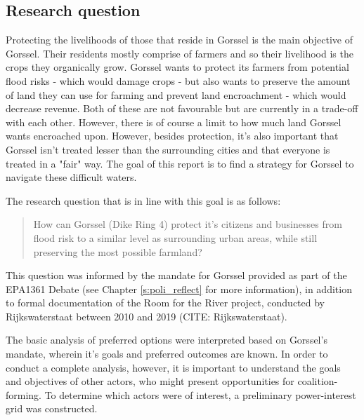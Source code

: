 \subsection{Research question}

Protecting the livelihoods of those that reside in Gorssel is the main objective of Gorssel. Their residents mostly comprise of farmers and so their livelihood is the crops they organically grow. Gorssel wants to protect its farmers from potential flood risks - which would damage crops - but also wants to preserve the amount of land they can use for farming and prevent land encroachment - which would decrease revenue. Both of these are not favourable but are currently in a trade-off with each other. However, there is of course a limit to how much land Gorssel wants encroached upon. However, besides protection, it's also important that Gorssel isn't treated lesser than the surrounding cities and that everyone is treated in a "fair" way. 
The goal of this report is to find a strategy for Gorssel to navigate these difficult waters. 


The research question that is in line with this goal is as follows: 
\begin{quote}
    How can Gorssel (Dike Ring 4) protect it's citizens and businesses from flood risk to a similar level as surrounding urban areas, while still preserving the most possible farmland?
\end{quote}

This question was informed by the mandate for Gorssel provided as part of the EPA1361 Debate (see Chapter \ref{s:poli_reflect} for more information), in addition to formal documentation of the Room for the River project, conducted by Rijkswaterstaat between 2010 and 2019 (CITE: Rijkswaterstaat).


The basic analysis of preferred options were interpreted based on Gorssel's mandate, wherein it's goals and preferred outcomes are known. In order to conduct a complete analysis, however, it is important to understand the goals and objectives of other actors, who might present opportunities for coalition-forming. To determine which actors were of interest, a preliminary power-interest grid was constructed.



